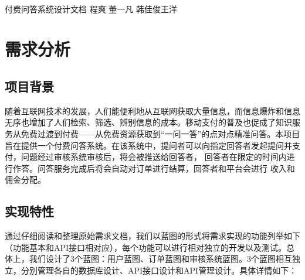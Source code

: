 \documentclass[12pt]{ctexart}
\date{}
\begin{document}
	\fancyhead[C]{\leftmark}					%
	
	\setcounter{page}{1}
	
	
	
	

	
		\begin{center}
		\quad \\
		\vskip 3.5cm
		\heiti \fontsize{30}{20} 付费问答系统设计文档%
		\vskip 1.5cm
		  程爽 \quad 董一凡 \quad 韩佳俊\quad 王洋
	\end{center}
	\vskip 3.5cm
	\vskip 1.5cm
\tableofcontents
\newpage
\section{需求分析}
\subsection{项目背景}
随着互联网技术的发展，人们能便利地从互联网获取大量信息，而信息爆炸和信息无序也增加了人们检索、筛选、辨别信息的成本。移动支付的普及也促成了知识服务从免费过渡到付费——从免费资源获取到“一问一答”的点对点精准问答。本项目旨在提供一个付费问答系统。在该系统中，提问者可以向指定回答者发起提问并支付，问题经过审核系统审核后，将会被推送给回答者， 回答者在限定的时间内进行作答。问答服务完成后将会自动对订单进行结算，回答者和平台会进行 收入和佣金分配。
\subsection{实现特性}
通过仔细阅读和整理原始需求文档，我们以蓝图的形式将需求实现的功能列举如下（功能基本和API接口相对应），每个功能可以进行相对独立的开发以及测试。总体上，我们设计了3个蓝图：用户蓝图、订单蓝图和审核系统蓝图。3个蓝图相互独立，分别管理各自的数据库设计、API接口设计和API管理设计。具体详情如下：
\end{document}
